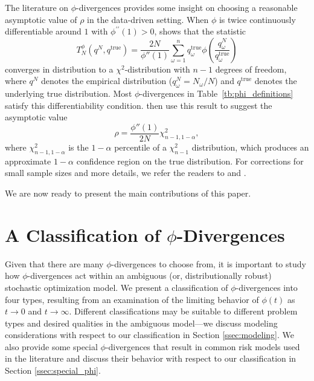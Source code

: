 \documentclass[opre,nonblindrev]{informs3} %
\newcommand{\qtrue}{q^{\text{true}}}
\begin{document}
The literature on $\phi$-divergences provides some insight on choosing a reasonable asymptotic value of $\rho$ in the data-driven setting. 
When $\phi$ is twice continuously differentiable around $1$ with $\phi^{\prime \prime}(1)>0$, \citep[Theorem 3.1]{pardo2005statistical} shows that the statistic
\[
	T^\phi_N(q^N,\qtrue) = \frac{2N}{\phi''(1)} \sum_{\omega=1}^n \qtrue_\omega \phi\left(\frac{q^N_\omega}{\qtrue_\omega}\right)
\]
converges in distribution to a $\chi^2$-distribution with $n-1$ degrees of freedom, where $q^N$ denotes the empirical distribution ($q^N_\omega = N_\omega/N$) and $\qtrue$ denotes the underlying true distribution.
Most $\phi$-divergences in Table~\ref{tb:phi_definitions} satisfy this differentiability condition.
\citet{bental2011robust} then use this result to suggest the asymptotic value
\begin{equation} \label{eq:asymptotic_rho}
	\rho = \frac{\phi''(1)}{2N} \chi^2_{n-1,1-\alpha},
\end{equation}
where $\chi^2_{n-1,1-\alpha}$ is the $1-\alpha$ percentile of a $\chi^2_{n-1}$ distribution, which produces an approximate $1-\alpha$ confidence region on the true distribution.
For corrections for small sample sizes and more details, we refer the readers to \citep{pardo2005statistical} and \citep{bental2011robust}. 

We are now ready to present the main contributions of this paper. 

\section{A Classification of $\phi$-Divergences}
\label{sec:classification}

Given that there are many $\phi$-divergences to choose from, it is important to study how $\phi$-divergences act within an ambiguous (or, distributionally robust) stochastic optimization model. 
We present a classification of $\phi$-divergences into four types, resulting from an examination of the limiting behavior of $\phi(t)$ as $t \rightarrow 0$ and $t \rightarrow \infty$.
Different classifications may be suitable to different problem types and desired qualities in the ambiguous model---we discuss modeling considerations with respect to our classification in Section \ref{ssec:modeling}.
We also provide some special $\phi$-divergences that result in common risk models used in the literature and discuss their behavior with respect to our classification in Section \ref{ssec:special_phi}.
\end{document}
